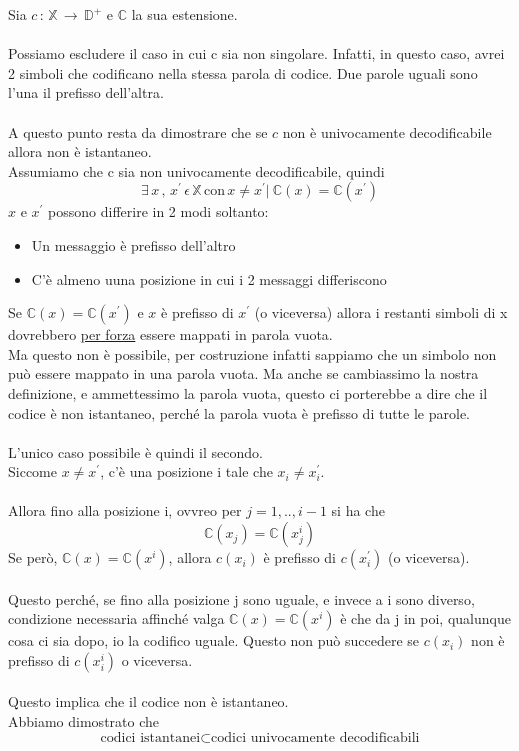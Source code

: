\documentclass{article}
\begin{document}
    \noindent Sia $c\,:\,\mathbb{X} \, \rightarrow \, \mathbb{D}^+$ e $\mathbb{C}$ la sua estensione. \\ \\
    Possiamo escludere il caso in cui c sia non singolare. Infatti, in questo caso, avrei 2 simboli che codificano nella stessa parola di codice. Due parole uguali sono l'una il prefisso dell'altra. \\ \\
    A questo punto resta da dimostrare che se $c$ non è univocamente decodificabile allora non è istantaneo. \\
    Assumiamo che c sia non univocamente decodificabile, quindi \begin{equation} \label{eq:one}
    \exists \, x \,,\,x^{'} \, \epsilon \, \mathbb{X}\, \text{con} \, x \neq x^{'} | \ \mathbb{C}(x) = \mathbb{C}(x^{'})
    \end{equation}
    $x$ e $x^{'}$ possono differire in 2 modi soltanto:
    \begin{itemize}
        \item Un messaggio è prefisso dell'altro
        \item C'è almeno uuna posizione in cui i 2 messaggi differiscono
    \end{itemize}
    Se $\mathbb{C}(x) = \mathbb{C}(x^{'})$ e $x$ è prefisso di $x^{'}$ (o viceversa) allora i restanti simboli di x dovrebbero \underline{per forza} essere mappati in parola vuota. \\ Ma questo non è possibile, per costruzione infatti sappiamo che un simbolo non può essere mappato in una parola vuota. Ma anche se cambiassimo la nostra definizione, e ammettessimo la parola vuota, questo ci porterebbe a dire che il codice è non istantaneo, perché la parola vuota è prefisso di tutte le parole.
    \\ \\
    L'unico caso possibile è quindi il secondo. \\ Siccome $x \neq x^{'}$, c'è una posizione i tale che $x_i \neq x_i^{'}$.
    \\ \\
    Allora fino alla posizione i, ovvreo per $j = 1,..,i-1$ si ha che
    $$\mathbb{C}(x_j) = \mathbb{C}(x_j^{i})$$
    Se però, $\mathbb{C}(x) = \mathbb{C}(x^{i})$, allora $c(x_i)$ è prefisso di $c(x_i^{'})$ (o viceversa). \\ \\

    \noindent Questo perché, se fino alla posizione j sono uguale, e invece a i sono diverso, condizione necessaria affinché valga  $\mathbb{C}(x) = \mathbb{C}(x^{i})$ è che da j in poi, qualunque cosa ci sia dopo, io la codifico uguale. Questo non può succedere se $c(x_i)$ non è prefisso di $c(x_i^{i})$ o viceversa.
    \\ \\
    Questo implica che il codice non è istantaneo.\\ Abbiamo dimostrato che $$\text{codici istantanei} \subset \text{codici univocamente decodificabili}$$
\end{document}
